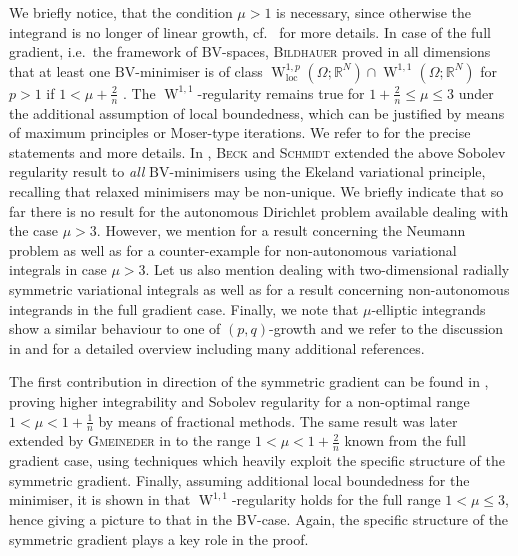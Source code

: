 \documentclass[a4paper,10pt,reqno,oneside]{amsart}
\numberwithin{equation}{section}
\newcommand{\R}{\mathbb R}
\newcommand{\sobo}{\operatorname{W}}
\newcommand{\BV}{\mathrm{BV}}
\newcommand{\loc}{\mathrm{loc}}
\begin{document}
We briefly notice, that the condition $\mu>1$ is necessary, since otherwise the integrand is no longer of linear growth, cf.~\cite[Rem. 4.14]{BEG} for more details. In case of the full gradient, i.e.~the framework of $\BV$-spaces, \textsc{Bildhauer} proved in all dimensions that at least one $\BV$-minimiser is of class $\sobo^{1,p}_\loc(\Omega;\R^N)\cap \sobo^{1,1}(\Omega;\R^N)$ for $p>1$ if $1<\mu +\frac{2}{n}$ . The $\sobo^{1,1}$-regularity remains true for $1+\frac{2}{n}\leq \mu\leq 3$ under the additional assumption of local boundedness, which can be justified by means of maximum principles or Moser-type iterations. We refer to \cite{Bildhauer} for the precise statements and more details. In \cite{BeckSchmidt}, \textsc{Beck} and \textsc{Schmidt} extended the above Sobolev regularity result to \emph{all} $\BV$-minimisers using the Ekeland variational principle, recalling that relaxed minimisers may be non-unique. We briefly indicate that so far there is no result for the autonomous Dirichlet problem available dealing with the case $\mu>3$. However, we mention \cite{Neumann} for a result concerning the Neumann problem as well as \cite{BildhauerLecNotes} for a counter-example for non-autonomous variational integrals in case $\mu>3$. Let us also mention \cite{Bildhauer2d} dealing with two-dimensional radially symmetric variational integrals as well as \cite{Lukas_Paul_etc} for a result concerning non-autonomous integrands in the full gradient case. Finally, we note that $\mu$-elliptic integrands show a similar behaviour to one of $(p,q)$-growth and we refer to the discussion in \cite{BEG} and \cite{DarkGuide} for a detailed overview including many additional references.

The first contribution in direction of the symmetric gradient can be found in \cite{GK}, proving higher integrability and Sobolev regularity for a non-optimal range $1<\mu<1+\frac{1}{n}$ by means of fractional methods. The same result was later extended by \textsc{Gmeineder} in \cite{Gmeineder} to the range $1<\mu<1+\frac{2}{n}$ known from the full gradient case, using techniques which heavily exploit the specific structure of the symmetric gradient. Finally, assuming additional local boundedness for the minimiser, it is shown in \cite{BEG} that $\sobo^{1,1}$-regularity holds for the full range $1<\mu\leq 3$, hence giving a picture to that in the $\BV$-case.  Again, the specific structure of the symmetric gradient plays a key role in the proof.
\end{document}
